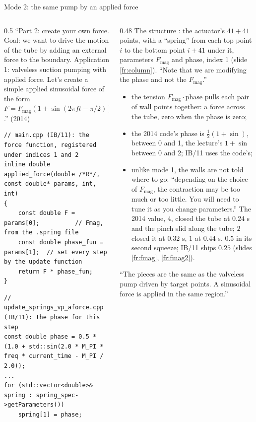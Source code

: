 \documentclass[aspectratio=169,11pt]{beamer}
\begin{document}
\begin{frame}[fragile]{Mode 2: the same pump by an applied force}
\label{fr:forcevp}
\begin{columns}[T,onlytextwidth]
\begin{column}{0.5\textwidth}
\footnotesize ``Part 2: create your own force. Goal: we want to drive the motion of the tube by adding an external force to the boundary. Application 1: valveless suction pumping with applied force. Let's create a simple applied sinusoidal force of the form $F = F_{\mathrm{mag}}(1 + \sin(2\pi f t - \pi/2))$.'' (2014)
\begin{lstlisting}[style=cpptiny]
// main.cpp (IB/11): the force function, registered under indices 1 and 2
inline double applied_force(double /*R*/, const double* params, int, int)
{
    const double F = params[0];          // Fmag, from the .spring file
    const double phase_fun = params[1];  // set every step by the update function
    return F * phase_fun;
}
\end{lstlisting}
\begin{lstlisting}[style=cpptiny]
// update_springs_vp_aforce.cpp (IB/11): the phase for this step
const double phase = 0.5 * (1.0 + std::sin(2.0 * M_PI * freq * current_time - M_PI / 2.0));
...
for (std::vector<double>& spring : spring_spec->getParameters())
    spring[1] = phase;
\end{lstlisting}
\end{column}
\begin{column}{0.48\textwidth}
\scriptsize The structure : the actuator's $41 + 41$ points, with a ``spring'' from each top point $i$ to the bottom point $i + 41$ under it, parameters $F_{\mathrm{mag}}$ and phase, index 1 (slide \ref{fr:column}). ``Note that we are modifying the phase and not the $F_{\mathrm{mag}}$.''
\begin{itemize}
  \item the tension $F_{\mathrm{mag}}\cdot\mathrm{phase}$ pulls each pair of wall points together: a force across the tube, zero when the phase is zero;
  \item the 2014 code's phase is $\frac12(1 + \sin)$, between 0 and 1, the lecture's $1 + \sin$ between 0 and 2; IB/11 uses the code's;
  \item unlike mode 1, the walls are not told where to go: ``depending on the choice of $F_{\mathrm{mag}}$, the contraction may be too much or too little. You will need to tune it as you change parameters.'' The 2014 value, $4$, closed the tube at $0.24$ s and the pinch slid along the tube; $2$ closed it at $0.32$ s, $1$ at $0.44$ s, $0.5$ in its second squeeze; IB/11 ships $0.25$ (slides \ref{fr:fmag}, \ref{fr:fmag2}).
\end{itemize}
\scriptsize ``The pieces are the same as the valveless pump driven by target points. A sinusoidal force is applied in the same region.''
\end{column}
\end{columns}
\end{frame}
\end{document}

